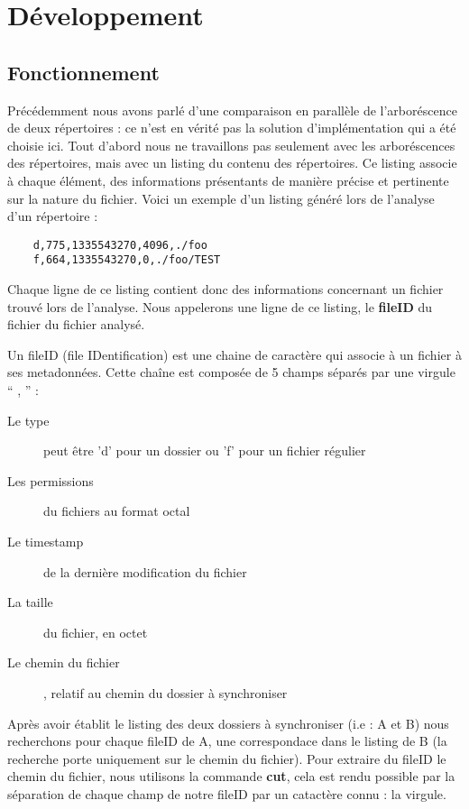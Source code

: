 \documentclass[a4paper,12pt]{report}
\begin{document}
	\chapter{Développement}
		\section{Fonctionnement}
			\begin{onehalfspace}
				Précédemment nous avons parlé d'une comparaison en parallèle de l'arboréscence de deux répertoires : ce n'est en vérité pas la solution d'implémentation qui a été choisie ici. Tout d'abord nous ne travaillons pas seulement avec les arboréscences des répertoires, mais avec un listing du contenu des répertoires. Ce listing associe à chaque élément, des informations présentants de manière précise et pertinente sur la nature du fichier. Voici un exemple d'un listing généré lors de l'analyse d'un répertoire :
				\begin{lstlisting}
	d,775,1335543270,4096,./foo
	f,664,1335543270,0,./foo/TEST
				\end{lstlisting}
				Chaque ligne de ce listing contient donc des informations concernant un fichier trouvé lors de l'analyse. Nous appelerons une ligne de ce listing, le \textbf{fileID} du fichier du fichier analysé.
				
				\vspace{0.5cm}

				Un fileID (file IDentification) est une chaine de caractère qui associe à un fichier à ses metadonnées. Cette chaîne est composée de 5 champs séparés par une virgule “ , ” :
				\begin{description}
					\item[Le type] peut être 'd' pour un dossier ou 'f' pour un fichier régulier
					\item[Les permissions] du fichiers au format octal
					\item[Le timestamp] de la dernière modification du fichier
					\item[La taille] du fichier, en octet
					\item[Le chemin du fichier], relatif au chemin du dossier à synchroniser
				\end{description}
				
				\vspace{0.5cm}
				
				Après avoir établit le listing des deux dossiers à synchroniser (i.e : A et B) nous recherchons pour chaque fileID de A, une correspondace dans le listing de B (la recherche porte uniquement sur le chemin du fichier). Pour extraire du fileID le chemin du fichier, nous utilisons la commande \textbf{cut}, cela est rendu possible par la séparation de chaque champ de notre fileID par un catactère connu : la virgule.
				

\end{onehalfspace}
\end{document}
